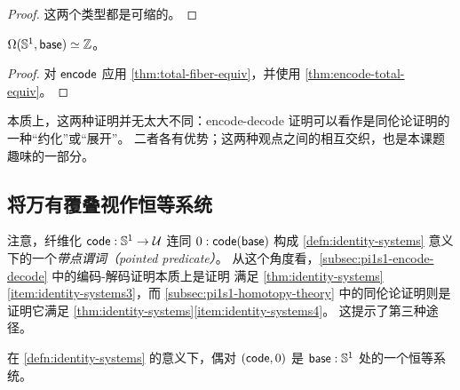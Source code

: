 \begin{proof}
  这两个类型都是可缩的。
\end{proof}

\begin{thm}
  $\Omega(\mathbb{S}^1,\mathsf{base}) \simeq \mathbb{Z}$。
\end{thm}

\begin{proof}
  对 $\mathsf{encode}$ 应用 \cref{thm:total-fiber-equiv}，并使用 \cref{thm:encode-total-equiv}。
\end{proof}

本质上，这两种证明并无太大不同：encode-decode 证明可以看作是同伦论证明的一种``约化''或``展开''。
二者各有优势；这两种观点之间的相互交织，也是本课题趣味的一部分。

\subsection{将万有覆叠视作恒等系统}
\label{sec:pi1s1-idsys}

注意，纤维化 $\mathsf{code}:\mathbb{S}^1\to\mathcal{U}$ 连同 $0:\mathsf{code}(\mathsf{base})$ 构成 \cref{defn:identity-systems} 意义下的一个\emph{带点谓词（pointed predicate）}。
从这个角度看，\cref{subsec:pi1s1-encode-decode} 中的编码-解码证明本质上是证明 \code 满足 \cref{thm:identity-systems}\ref{item:identity-systems3}，而 \cref{subsec:pi1s1-homotopy-theory} 中的同伦论证明则是证明它满足 \cref{thm:identity-systems}\ref{item:identity-systems4}。
这提示了第三种途径。

\begin{thm}
  在 \cref{defn:identity-systems} 的意义下，偶对 $(\mathsf{code},0)$ 是 $\mathsf{base}:\mathbb{S}^1$ 处的一个恒等系统。
\end{thm}

